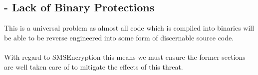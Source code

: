 \subsection*{ - Lack of Binary Protections}
This is a universal problem as almost all code which is compiled into binaries will be able to be reverse engineered into some form of discernable source code.\\
\textbf{\\}
With regard to SMSEncryption this means we must ensure the former sections are well taken care of to mitigate the effects of this threat.